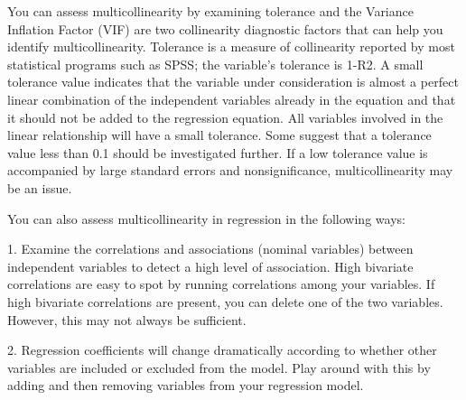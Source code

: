 \documentclass[12pt]{article}
\begin{document}
You can assess multicollinearity by examining tolerance and the Variance Inflation Factor (VIF) are two collinearity diagnostic factors that can help you identify multicollinearity. Tolerance is a measure of collinearity reported by most statistical programs such as SPSS; the variable’s tolerance is 1-R2. A small tolerance value indicates that the variable under consideration is almost a perfect linear combination of the independent variables already in the equation and that it should not be added to the regression equation. All variables involved in the linear relationship will have a small tolerance. Some suggest that a tolerance value less than 0.1 should be investigated further. If a low tolerance value is accompanied by large standard errors and nonsignificance, multicollinearity may be an issue.
%
%

You can also assess multicollinearity in regression in the following ways:

1. Examine the correlations and associations (nominal variables) between independent variables to detect a high level of association. High bivariate correlations are easy to spot by running correlations among your variables. If high bivariate correlations are present, you can delete one of the two variables. However, this may not always be sufficient.

2. Regression coefficients will change dramatically according to whether other variables are included or excluded from the model. Play around with this by adding and then removing variables from your regression model.
\end{document}
